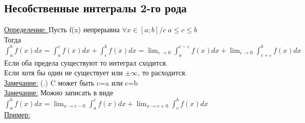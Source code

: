 \documentclass[12pt]{article}
\begin{document}
    \subsection{Несобственные интегралы 2-го рода}
    \underline{Определение: } Пусть f(x) непрерывна $\forall x \in [a;b]/c \; a \leq c \leq b$\\
    Тогда $\int_{a}^{b}f(x)dx=\int_{a}^{c} f(x)dx+\int_{c}^{b} f(x)dx=\lim_{\varepsilon \to 0}\int_{a}^{c-\varepsilon}f(x)dx+\lim_{\varepsilon \to 0}\int_{c+\varepsilon}^{b}f(x)dx$\\
    Если оба предела существуют то интеграл сходится.\\
    Если хотя бы один не существует или $\pm \infty$, то расходится.\\
    \underline{Замечание:} (.) C может быть c=a или c=b\\
    \underline{Замечание:} Можно записать в виде $\int_{a}^{b}f(x)dx=\lim_{x \to c-0}\int_{a}^{c}f(x)dx+\lim_{x \to c+0} \int_{c}^{b}f(x)dx$\\
    \underline{Пример:}\\
\end{document}
